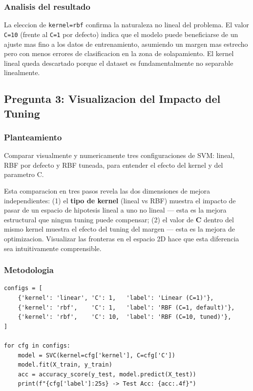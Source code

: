 \documentclass[12pt,a4paper]{article}
\begin{document}
\subsubsection*{Analisis del resultado}

La eleccion de \texttt{kernel=rbf} confirma la naturaleza no lineal del problema. El valor
\texttt{C=10} (frente al \texttt{C=1} por defecto) indica que el modelo puede beneficiarse de
un ajuste mas fino a los datos de entrenamiento, asumiendo un margen mas estrecho pero con menos
errores de clasificacion en la zona de solapamiento. El kernel lineal queda descartado porque el
dataset es fundamentalmente no separable linealmente.

\subsection{Pregunta 3: Visualizacion del Impacto del Tuning}

\subsubsection*{Planteamiento}
Comparar visualmente y numericamente tres configuraciones de SVM: lineal, RBF por defecto y RBF
tuneada, para entender el efecto del kernel y del parametro C.

\begin{tcolorbox}[porquebox, title={Por que comparar kernel lineal, RBF default y RBF tuneado?}]
Esta comparacion en tres pasos revela las dos dimensiones de mejora independientes: (1) el
\textbf{tipo de kernel} (lineal vs RBF) muestra el impacto de pasar de un espacio de hipotesis
lineal a uno no lineal --- esta es la mejora estructural que ningun tuning puede compensar; (2)
el valor de \textbf{C} dentro del mismo kernel muestra el efecto del tuning del margen --- esta
es la mejora de optimizacion. Visualizar las fronteras en el espacio 2D hace que esta diferencia
sea intuitivamente comprensible.
\end{tcolorbox}

\subsubsection*{Metodologia}

\begin{lstlisting}[caption={Comparacion de tres configuraciones SVM}]
configs = [
    {'kernel': 'linear', 'C': 1,   'label': 'Linear (C=1)'},
    {'kernel': 'rbf',    'C': 1,   'label': 'RBF (C=1, default)'},
    {'kernel': 'rbf',    'C': 10,  'label': 'RBF (C=10, tuned)'},
]

for cfg in configs:
    model = SVC(kernel=cfg['kernel'], C=cfg['C'])
    model.fit(X_train, y_train)
    acc = accuracy_score(y_test, model.predict(X_test))
    print(f"{cfg['label']:25s} -> Test Acc: {acc:.4f}")
\end{lstlisting}
\end{document}
